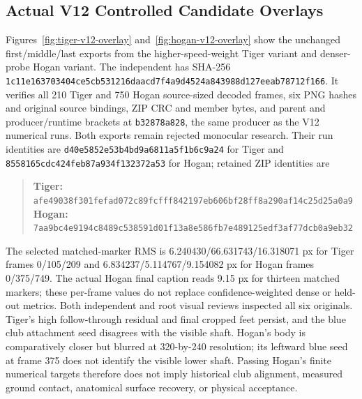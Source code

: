 \documentclass[11pt,letterpaper]{article}
\newcommand{\code}[1]{\nolinkurl{#1}}
\newcommand{\hash}[1]{{\footnotesize\nolinkurl{#1}}}
\begin{document}
\subsection{Actual V12 Controlled Candidate Overlays}
Figures~\ref{fig:tiger-v12-overlay} and~\ref{fig:hogan-v12-overlay} show the
unchanged first/middle/last exports from the higher-speed-weight Tiger variant
and denser-probe Hogan variant. The independent
 has SHA-256
\hash{1c11e163703404ce5cb531216daacd7f4a9d4524a843988d127eeab78712f166}.
It verifies all 210 Tiger and 750 Hogan source-sized decoded frames, six PNG
hashes and original source bindings, ZIP CRC and member bytes, and parent and
producer/runtime brackets at \code{b32878a828}, the same producer as the V12
numerical runs. Both exports remain rejected monocular research. Their run
identities are \code{d40e5852e53b4bd9a6811a5f1b6c9a24} for Tiger and
\code{8558165cdc424feb87a934f132372a53} for Hogan; retained ZIP identities are
\begin{quote}\small
\textbf{Tiger:}
\hash{afe49038f301fefad072c89fcfff842197eb606bf28ff8a290af14c25d25a0a9}\\
\textbf{Hogan:}
\hash{7aa9bc4e9194c8489c538591d01f13a8e586fb7e489125edf3af77dcb0a9eb32}
\end{quote}

The selected matched-marker RMS is 6.240430/66.631743/16.318071 px for Tiger
frames 0/105/209 and 6.834237/5.114767/9.154082 px for Hogan frames 0/375/749.
The actual Hogan final caption reads 9.15 px for thirteen matched markers;
these per-frame values do not replace confidence-weighted dense or held-out
metrics. Both independent and root visual reviews inspected all six originals.
Tiger's high follow-through residual and final cropped feet persist, and the
blue club attachment seed disagrees with the visible shaft. Hogan's body is
comparatively closer but blurred at 320-by-240 resolution; its leftward blue
seed at frame 375 does not identify the visible lower shaft. Passing Hogan's
finite numerical targets therefore does not imply historical club alignment,
measured ground contact, anatomical surface recovery, or physical acceptance.
\end{document}
